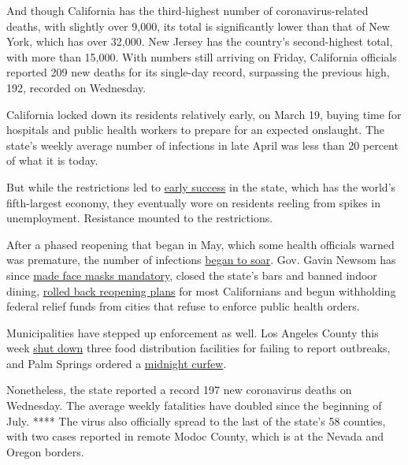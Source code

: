 And though California has the third-highest number of
coronavirus-related deaths, with slightly over 9,000, its total is
significantly lower than that of New York, which has over 32,000. New
Jersey has the country's second-highest total, with more than 15,000.
With numbers still arriving on Friday, California officials reported 209
new deaths for its single-day record, surpassing the previous high, 192,
recorded on Wednesday.

California locked down its residents relatively early, on March 19,
buying time for hospitals and public health workers to prepare for an
expected onslaught. The state's weekly average number of infections in
late April was less than 20 percent of what it is today.

But while the restrictions led to
\href{https://www.nytimes.com/2020/04/14/us/california-coronavirus-shutdown.html}{early
success} in the state, which has the world's fifth-largest economy, they
eventually wore on residents reeling from spikes in unemployment.
Resistance mounted to the restrictions.

After a phased reopening that began in May, which some health officials
warned was premature, the number of infections
\href{https://www.nytimes.com/2020/06/29/us/california-coronavirus-reopening.html}{began
to soar}. Gov. Gavin Newsom has since
\href{https://www.nytimes.com/interactive/2020/07/17/upshot/coronavirus-face-mask-map.html}{made
face masks mandatory}, closed the state's bars and banned indoor dining,
\href{https://www.nytimes.com/2020/07/14/us/california-counties-reopening.html}{rolled
back reopening plans} for most Californians and begun withholding
federal relief funds from cities that refuse to enforce public health
orders.

Municipalities have stepped up enforcement as well. Los Angeles County
this week
\href{https://www.latimes.com/california/story/2020-07-29/county-shuts-three-businesses-for-failing-to-report-coronavirus-outbreaks}{shut
down} three food distribution facilities for failing to report
outbreaks, and Palm Springs ordered a
\href{https://www.palmspringsca.gov/home/showdocument?id=75670}{midnight
curfew}.

Nonetheless, the state reported a record 197 new coronavirus deaths on
Wednesday. The average weekly fatalities have doubled since the
beginning of July. **** The virus also officially spread to the last of
the state's 58 counties, with two cases reported in remote Modoc County,
which is at the Nevada and Oregon borders.

